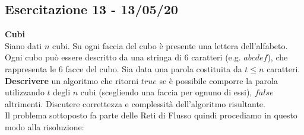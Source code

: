 \documentclass[../cheatSheetAlgoritmi.tex]{subfiles}
\begin{document}
\subsection{Esercitazione 13 - 13/05/20}
\textbf{Cubi}\\
Siano dati $n$ cubi. Su ogni faccia del cubo è presente una lettera dell'alfabeto. Ogni cubo può essere descritto da una stringa di $6$ caratteri (e.g. $abcdef$), che rappresenta le 6 facce del cubo. Sia data una parola costituita da $t \leq n$ caratteri. \textbf{Descrivere} un algoritmo che ritorni $true$ se è possibile comporre la parola utilizzando $t$ degli $n$ cubi (scegliendo una faccia per ognuno di essi), $false$ altrimenti. Discutere correttezza e complessità dell'algoritmo risultante.\\
Il problema sottoposto fa parte delle Reti di Flusso quindi procediamo in questo modo alla risoluzione:
\end{document}
